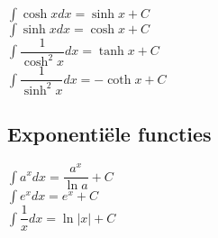 $\displaystyle\int \cosh x dx = \sinh x + C$\\
$\displaystyle\int \sinh x dx = \cosh x + C$\\
$\displaystyle\int \dfrac{1}{\cosh^2 x}dx = \tanh x + C$\\
$\displaystyle\int \dfrac{1}{\sinh^2 x}dx = -\coth x + C$\\

\subsection{Exponentiële functies}

$\displaystyle\int a^x dx = \dfrac{a^x}{\ln a} + C$\\
$\displaystyle\int e^x dx = e^x + C$\\
$\displaystyle\int \dfrac{1}{x}dx = \ln |x| + C$\\